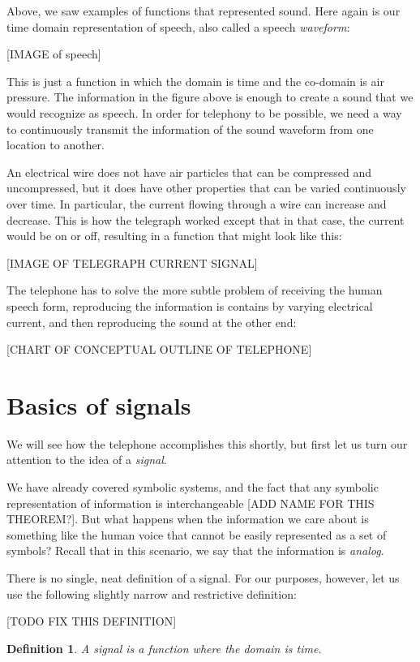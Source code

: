 \documentclass[UTF8]{book}
\newtheorem{definition}{Definition}
\begin{document}
\begin{CJK}{UTF8}{gbsn}
Above, we saw examples of functions that represented sound. Here again is our time domain representation of speech, also called a speech \emph{waveform}:

[IMAGE of speech]

This is just a function in which the domain is time and the co-domain is air pressure. The information in the figure above is enough to create a sound that we would recognize as speech. In order for telephony to be possible, we need a way to continuously transmit the information of the sound waveform from one location to another.

An electrical wire does not have air particles that can be compressed and uncompressed, but it does have other properties that can be varied continuously over time. In particular, the current flowing through a wire can increase and decrease. This is how the telegraph worked except that in that case, the current would be on or off, resulting in a function that might look like this:

[IMAGE OF TELEGRAPH CURRENT SIGNAL]

The telephone has to solve the more subtle problem of receiving the human speech form, reproducing the information is contains by varying electrical current, and then reproducing the sound at the other end:

[CHART OF CONCEPTUAL OUTLINE OF TELEPHONE]

\section{Basics of signals}

We will see how the telephone accomplishes this shortly, but first let us turn our attention to the idea of a \emph{signal}.

We have already covered symbolic systems, and the fact that any symbolic representation of information is interchangeable [ADD NAME FOR THIS THEOREM?]. But what happens when the information we care about is something like the human voice that cannot be easily represented as a set of symbols? Recall that in this scenario, we say that the information is \emph{analog}.

There is no single, neat definition of a signal. For our purposes, however, let us use the following slightly narrow and restrictive definition:

[TODO FIX THIS DEFINITION]

\begin{definition}
A \emph{signal} is a function where the domain is time.
\end{definition}


\end{CJK}
\end{document}
